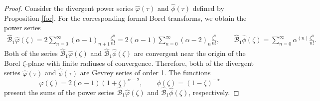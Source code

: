\documentclass[pdftex]{sigma}
\numberwithin{equation}{section}
\begin{document}
 \begin{proof}
 Consider the divergent power series $\hat{\varphi}(\tau)$ and $\hat{\phi}(\tau)$ defined by Proposition \ref{for}. For the corresponding
 formal Borel transforms, we obtain the power series
 \begin{gather*}
 \hat{\mathcal{B}}_1 \hat{\varphi}(\zeta)
 =
 2 \sum_{n=0}^{\infty} (\alpha-1)_{n+1} \frac{\zeta^n}{n!}=
 2 (\alpha-1) \sum_{n=0}^{\infty} (\alpha-2)_n \frac{\zeta^n}{n!},\qquad
 \hat{\mathcal{B}}_1 \hat{\phi}(\zeta)
 =
 \sum_{n=0}^{\infty} \alpha^{(n)} \frac{\zeta^n}{n!} .
 \end{gather*}
 Both of the series $\hat{\mathcal{B}}_1 \hat{\varphi}(\zeta)$ and $\hat{\mathcal{B}}_1 \hat{\phi}(\zeta)$ are convergent near the origin
 of the Borel $\zeta$-plane with finite radiuses of convergence. Therefore, both of the divergent series $\hat{\varphi}(\tau)$
 and $\hat{\phi}(\tau)$ are Gevrey series of order 1. The functions
 \[
 \varphi(\zeta)=2 (\alpha-1) (1+\zeta)^{\alpha-2},\qquad
 \phi(\zeta)=(1-\zeta)^{-\alpha}
 \]
 present the sums of the power series $\hat{\mathcal{B}}_1 \hat{\varphi}(\zeta)$ and $\hat{\mathcal{B}}_1 \hat{\phi}(\zeta)$, respectively.


\end{proof}
\end{document}
